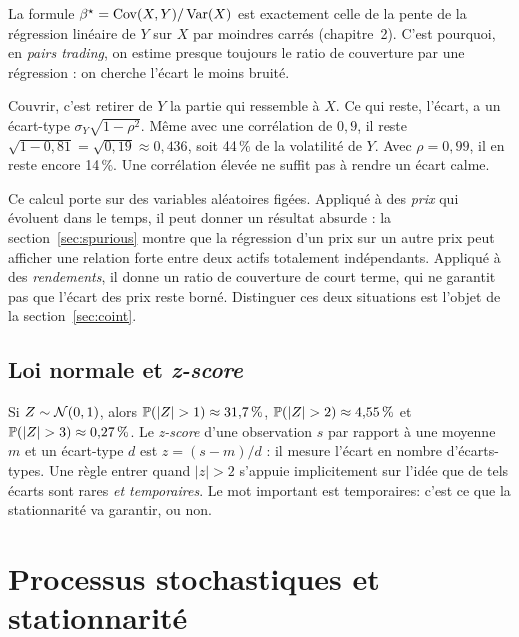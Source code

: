\documentclass[11pt,a4paper]{article}
\begin{document}
\begin{remark}
La formule $\beta^\star = \operatorname{Cov}(X,Y)/\operatorname{Var}(X)$ est exactement celle de la pente de la régression linéaire de $Y$ sur $X$ par moindres carrés (chapitre~2). C'est pourquoi, en \emph{pairs trading}, on estime presque toujours le ratio de couverture par une régression : on cherche l'écart le moins bruité.
\end{remark}

\begin{intuition}
Couvrir, c'est retirer de $Y$ la partie qui \og ressemble\fg{} à $X$. Ce qui reste, l'écart, a un écart-type $\sigma_Y\sqrt{1-\rho^2}$. Même avec une corrélation de $0{,}9$, il reste $\sqrt{1-0{,}81} = \sqrt{0{,}19} \approx 0{,}436$, soit 44\,\% de la volatilité de $Y$. Avec $\rho = 0{,}99$, il en reste encore 14\,\%. Une corrélation \og élevée\fg{} ne suffit pas à rendre un écart calme.
\end{intuition}

\begin{pitfall}
Ce calcul porte sur des variables aléatoires \og figées\fg. Appliqué à des \emph{prix} qui évoluent dans le temps, il peut donner un résultat absurde : la section~\ref{sec:spurious} montre que la régression d'un prix sur un autre prix peut afficher une relation forte entre deux actifs totalement indépendants. Appliqué à des \emph{rendements}, il donne un ratio de couverture de court terme, qui ne garantit pas que l'écart des prix reste borné. Distinguer ces deux situations est l'objet de la section~\ref{sec:coint}.
\end{pitfall}

\subsection{Loi normale et \emph{z-score}}

Si $Z \sim \mathcal{N}(0,1)$, alors $\mathbb{P}(|Z| > 1) \approx 31{,}7\,\%$, $\Prob(|Z|>2) \approx 4{,}55\,\%$ et $\Prob(|Z|>3) \approx 0{,}27\,\%$. Le \emph{z-score} d'une observation $s$ par rapport à une moyenne $m$ et un écart-type $d$ est $z = (s-m)/d$ : il mesure l'écart \og en nombre d'écarts-types\fg. Une règle \og entrer quand $|z|>2$\fg{} s'appuie implicitement sur l'idée que de tels écarts sont rares \emph{et temporaires}. Le mot important est \og temporaires\fg : c'est ce que la stationnarité va garantir, ou non.

\section{Processus stochastiques et stationnarité}
\end{document}
